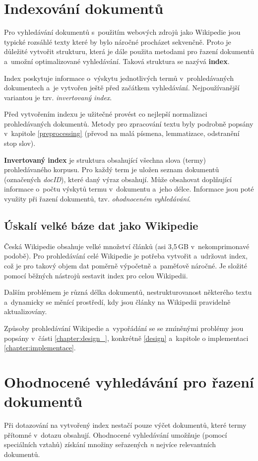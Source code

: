 \section{Indexování dokumentů}
Pro vyhledávání dokumentů s~použitím webových zdrojů jako Wikipedie jsou typické rozsáhlé texty které by bylo náročné procházet sekvenčně. Proto je důležité vytvořit strukturu, která je dále použita metodami pro řazení dokumentů a~umožní optimalizované vyhledávání. Taková struktura se nazývá \textbf{index}.\par
Index poskytuje informace o~výskytu jednotlivých termů v~prohledávaných dokumentech a~je vytvořen ještě před začátkem vyhledávání. Nejpoužívanější variantou je tzv. \emph{invertovaný index}.\par
Před vytvořením indexu je užitečné provést co nejlepší normalizaci prohledávaných dokumentů. Metody pro zpracování textu byly podrobně popsány v~kapitole \ref{preprocessing} (převod na malá písmena, lemmatizace, odstranění stop slov).\par
\textbf{Invertovaný index} je struktura obsahující všechna slova (termy) prohledávaného korpusu. Pro každý term je uložen seznam dokumentů (označených \emph{docID}), které daný výraz obsahují. Může obsahovat doplňující informace o~počtu výskytů termu v~dokumentu a~jeho délce. Informace jsou poté využity při řazení dokumentů, tzv. \emph{ohodnoceném vyhledávání}.

\subsection{Úskalí velké báze dat jako Wikipedie}
Česká Wikipedie obsahuje velké množství článků (asi 3,5\,GB v~nekomprimonavé podobě). Pro prohledávání celé Wikipedie je potřeba vytvořit a~udržovat index, což je pro takový objem dat poměrně výpočetně a~paměťově náročné. Je složité pomocí běžných nástrojů sestavit index pro celou Wikipedii.\par
Dalším problémem je různá délka dokumentů, nestrukturovanost některého textu a~dynamicky se měnící prostředí, kdy jsou články na Wikipedii pravidelně aktualizovány.\par\enlargethispage{\baselineskip}
Způsoby prohledávání Wikipedie a~vypořádání se se zmíněnými problémy jsou popsány v~části \ref{chapter:design_}, konkrétně \ref{design} a~kapitole o implementaci \ref{chapter:implementace}.

\section{Ohodnocené vyhledávání pro řazení dokumentů}
Při dotazování na vytvořený index nestačí pouze výčet dokumentů, které termy přítomné v~dotazu obsahují. Ohodnocené vyhledávání umožňuje (pomocí speciálních vztahů) získání množiny seřazených \emph{n} nejvíce relevantních dokumentů.\par

